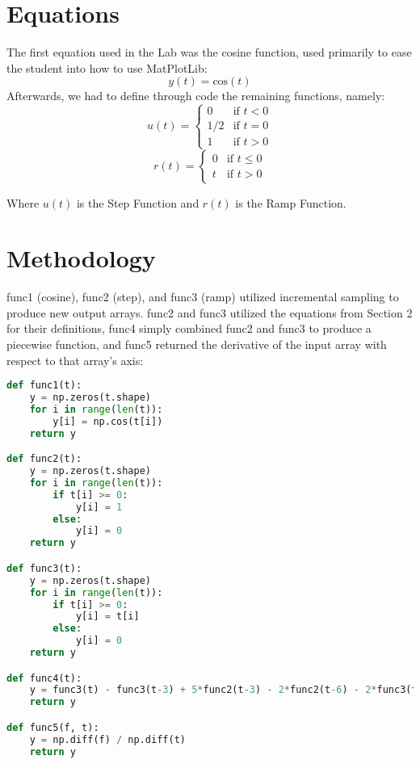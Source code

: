 \documentclass[12pt]{report}
\begin{document}
\section{Equations}

The first equation used in the Lab was the cosine function, used primarily to ease the student into how to use MatPlotLib:
\begin{equation}
    y(t) =  \textrm{cos}(t)
\end{equation}
Afterwards, we had to define through code the remaining functions, namely:
\begin{equation}
    u(t) = 
    \begin{cases}
        0 & \text{if $t<0$} \\
        1/2 & \text{if $t=0$} \\
        1 & \text{if $t>0$}
    \end{cases}
\end{equation}
\begin{equation}
    r(t) = 
    \begin{cases}
        0 & \text{if $t\leq0$} \\
        t & \text{if $t>0$}
    \end{cases}
\end{equation}
\begin{center}
Where $u(t)$ is the Step Function and $r(t)$ is the Ramp Function.
\end{center} \pagebreak


\section{Methodology}

func1 (cosine), func2 (step), and func3 (ramp) utilized incremental sampling to produce new output arrays. func2 and func3 utilized the equations from Section 2 for their definitions, func4 simply combined func2 and func3 to produce a piecewise function, and func5 returned the derivative of the input array with respect to that array's axis:
\begin{lstlisting}[language=Python]
def func1(t): 
    y = np.zeros(t.shape)
    for i in range(len(t)):
        y[i] = np.cos(t[i])
    return y

def func2(t):
    y = np.zeros(t.shape)
    for i in range(len(t)):
        if t[i] >= 0:
            y[i] = 1
        else:
            y[i] = 0
    return y

def func3(t):
    y = np.zeros(t.shape)
    for i in range(len(t)):
        if t[i] >= 0:
            y[i] = t[i]
        else:
            y[i] = 0
    return y

def func4(t):
    y = func3(t) - func3(t-3) + 5*func2(t-3) - 2*func2(t-6) - 2*func3(t-6)
    return y

def func5(f, t):
    y = np.diff(f) / np.diff(t)
    return y
\end{lstlisting}
\pagebreak
\end{document}
